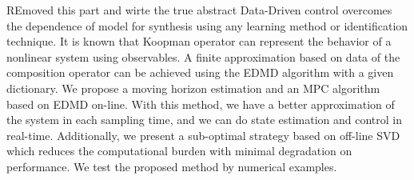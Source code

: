
{\color{red} REmoved this part and wirte the true abstract}
Data-Driven control overcomes the dependence of model for synthesis using any learning method or identification technique. It is known that Koopman operator can represent the behavior of a nonlinear system using observables. A finite approximation based on data of the composition operator can be achieved using the EDMD algorithm with a given dictionary. We propose a moving horizon estimation and an MPC algorithm based on EDMD on-line. With this method, we have a better approximation of the system in each sampling time, and we can do state estimation and control in real-time. Additionally, we present a sub-optimal strategy based on off-line SVD which reduces the computational burden with minimal degradation on performance. We test the proposed method by numerical examples.  
